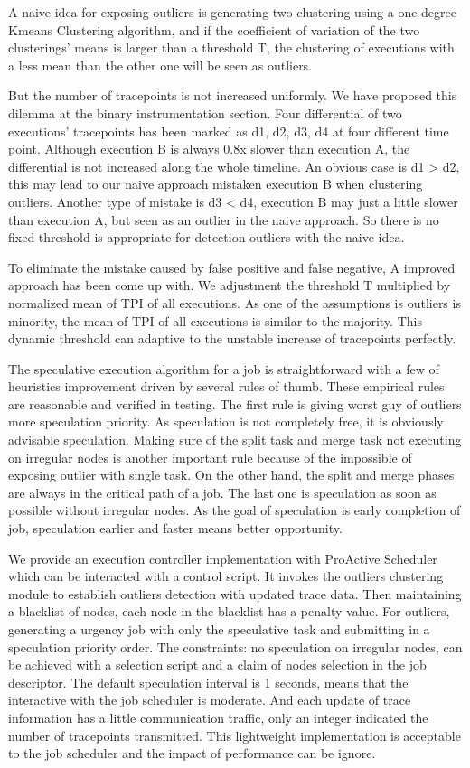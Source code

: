 A naive idea for exposing outliers is generating two clustering using a one-degree Kmeans Clustering algorithm, and if the coefficient of variation of the two clusterings’ means is larger than a threshold T, the clustering of executions with a less mean than the other one  will be seen as outliers.

But the number of tracepoints is not increased uniformly. We have proposed this dilemma at the binary instrumentation section. Four differential of two executions’ tracepoints has been marked as d1, d2, d3, d4 at four different time point. Although execution B is always 0.8x slower than execution A, the differential is not increased along the whole timeline. An obvious case is d1 > d2, this may lead to our naive approach mistaken execution B when clustering outliers. Another type of mistake is d3 < d4, execution B may just a little slower than execution A, but seen as an outlier in the naive approach. So there is no fixed threshold is appropriate for detection outliers with the naive idea.

To eliminate  the mistake caused by false positive and false negative, A improved approach has been come up with. We adjustment the threshold T multiplied by normalized mean of TPI of all executions. As one of the assumptions is outliers is minority, the mean of TPI of all executions is similar to the majority. This dynamic threshold can adaptive to the unstable increase of tracepoints perfectly.

The speculative execution algorithm for a job is straightforward with a few of heuristics improvement driven by several rules of thumb. These empirical rules are reasonable and verified in testing. The first rule is giving worst guy of outliers more speculation priority. As speculation is not completely free, it is obviously advisable speculation. Making sure of the split task and merge task not executing on irregular nodes is another important rule because of the impossible of exposing outlier with single task. On the other hand, the split and merge phases are always in the critical path of a job. The last one is speculation as soon as possible without irregular nodes. As the goal of speculation is early completion of job, speculation earlier and faster means better opportunity.

We provide an execution controller implementation with ProActive Scheduler which can be interacted with  a control script. It invokes the outliers clustering module to establish outliers detection with updated trace data. Then maintaining a blacklist of nodes, each node in the blacklist has a penalty value. For outliers, generating a urgency job with only the speculative task and submitting in a speculation priority order. The constraints: no speculation on irregular nodes, can be achieved with a selection script and a claim of nodes selection in the job descriptor. The default speculation interval is 1 seconds, means that the interactive with the job scheduler is moderate. And each update of trace information has a little communication traffic, only an integer indicated the number of  tracepoints transmitted. This lightweight implementation is acceptable to the job scheduler and the impact of performance can be ignore.
